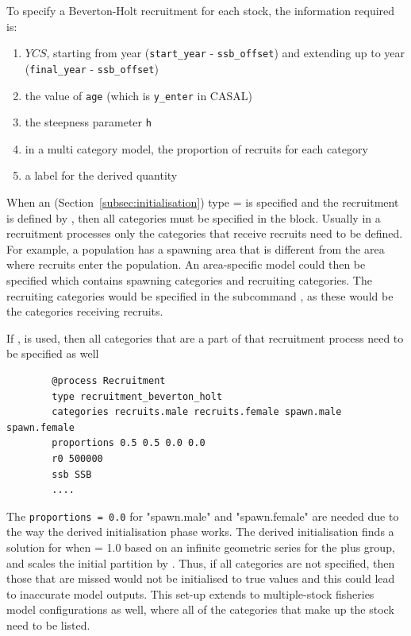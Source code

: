 To specify a Beverton-Holt recruitment for each stock, the information required is:

\begin{enumerate}
	\item $YCS$, starting from year (\texttt{start\_year} - \texttt{ssb\_offset}) and extending up to year (\texttt{final\_year} - \texttt{ssb\_offset})
	\item the value of \texttt{age} (which is \texttt{y\_enter} in CASAL)
	\item the steepness parameter \texttt{h}
	\item in a multi category model, the proportion of recruits for each category
	\item a label for the derived quantity
\end{enumerate}

When an  (Section~\ref{subsec:initialisation}) type =  is specified and the recruitment is defined by , then all categories must be specified in the  block. Usually in a recruitment processes only the categories that receive recruits need to be defined. For example, a population has a spawning area that is different from the area where recruits enter the population. An area-specific model could then be specified which contains spawning categories and recruiting categories. The recruiting categories would be specified in the subcommand , as these would be the categories receiving recruits.

If ,  is used, then all categories that are a part of that recruitment process need to be specified as well

{\small{\begin{verbatim}
		@process Recruitment
		type recruitment_beverton_holt
		categories recruits.male recruits.female spawn.male spawn.female
		proportions 0.5 0.5 0.0 0.0
		r0 500000
		ssb SSB
		....
		\end{verbatim}}}
	
The \texttt{proportions = 0.0} for "spawn.male" and "spawn.female" are needed due to the way the derived initialisation phase works. The derived initialisation finds a solution for when  = 1.0 based on an infinite geometric series for the plus group, and scales the initial partition by . Thus, if all categories are not specified, then those that are missed would not be initialised to true values and this could lead to inaccurate model outputs. This set-up extends to multiple-stock fisheries model configurations as well, where all of the categories that make up the stock need to be listed.

